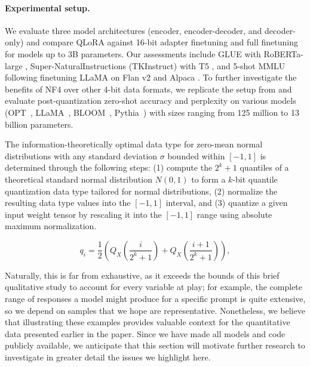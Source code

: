 \paragraph{Experimental setup.} We evaluate three model architectures (encoder, encoder-decoder, and decoder-only) and compare QLoRA against 16-bit adapter finetuning and full finetuning for models up to 3B parameters. Our assessments include GLUE \citep{wang2018glue} with RoBERTa-large \citep{liu2019roberta}, Super-NaturalInstructions (TKInstruct) \citep{wang2022super} with T5 \citep{t5}, and 5-shot MMLU \citep{hendrycksmeasuring} following finetuning LLaMA on Flan v2 \citep{longpre2023flan} and Alpaca \citep{alpaca}. To further investigate the benefits of NF4 over other 4-bit data formats, we replicate the setup from \citet{dettmers2022case} and evaluate post-quantization zero-shot accuracy and perplexity on various models (OPT~\citep{zhang2022opt}, LLaMA~\citep{touvron2023llama}, BLOOM~\citep{scao2022bloom}, Pythia~\citep{biderman2023pythia}) with sizes ranging from 125 million to 13 billion parameters.

The information-theoretically optimal data type for zero-mean normal distributions with any standard deviation $\sigma$ bounded within $[-1, 1]$ is determined through the following steps: (1) compute the $2^k+1$ quantiles of a theoretical standard normal distribution $N(0, 1)$ to form a $k$-bit quantile quantization data type tailored for normal distributions, (2) normalize the resulting data type values into the $[-1, 1]$ interval, and (3) quantize a given input weight tensor by rescaling it into the $[-1, 1]$ range using absolute maximum normalization.

\begin{equation}
q_i  = \frac{1}{2}\left( Q_X\left(\frac{i}{2^k+1}\right) + Q_X\left(\frac{i+1}{2^k+1}\right)\right),
\end{equation}

Naturally, this is far from exhaustive, as it exceeds the bounds of this brief qualitative study to account for every variable at play; for example, the complete range of responses a model might produce for a specific prompt is quite extensive, so we depend on samples that we hope are representative. Nonetheless, we believe that illustrating these examples provides valuable context for the quantitative data presented earlier in the paper. Since we have made all models and code publicly available, we anticipate that this section will motivate further research to investigate in greater detail the issues we highlight here.  
